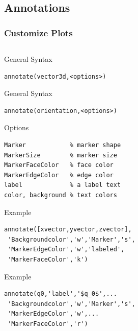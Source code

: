 \documentclass[compress]{beamer}
\begin{document}
\subsection*{Annotations}

\begin{frame}[fragile]
  \frametitle{Customize Plots}

\begin{columns}
  \begin{column}{8.5cm}

\begin{overprint}
  General Syntax%
\begin{lstlisting}[style=input]
annotate(vector3d,<options>)
\end{lstlisting}
  General Syntax
\begin{lstlisting}[style=input]
annotate(orientation,<options>)
\end{lstlisting}
\end{overprint}

Options
\begin{lstlisting}[style=input]
Marker            % marker shape
MarkerSize        % marker size
MarkerFaceColor   % face color
MarkerEdgeColor   % edge color
label             % a label text
color, background % text colors
\end{lstlisting}

\begin{overprint}
  Example
\begin{lstlisting}[style=input]
annotate([xvector,yvector,zvector],
 'Backgroundcolor','w','Marker','s',
 'MarkerEdgeColor','w','labeled',
 'MarkerFaceColor','k')
\end{lstlisting}

Example
\begin{lstlisting}[style=input]
annotate(q0,'label','$q_0$',...
 'Backgroundcolor','w','Marker','s',
 'MarkerEdgeColor','w',...
 'MarkerFaceColor','r')
\end{lstlisting}

\end{overprint}

\end{column}


\end{columns}
\end{frame}
\end{document}
